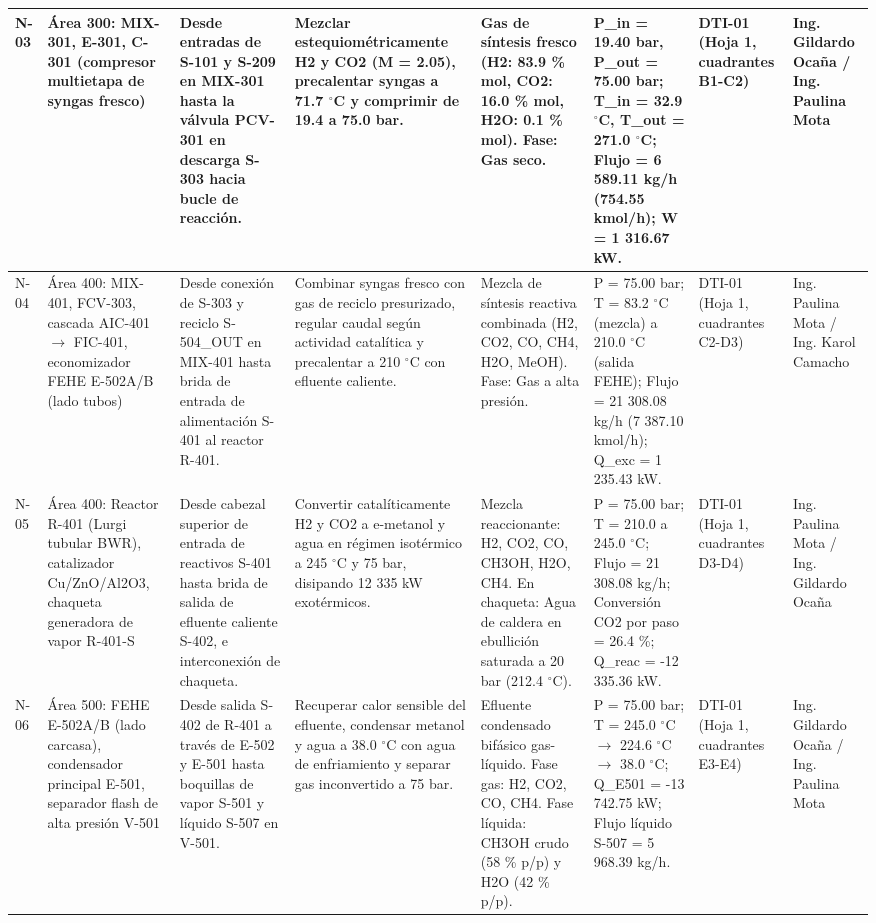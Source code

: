 \documentclass[10pt,letterpaper]{article}
\begin{document}
\begin{landscape}
\begin{table}[H]
\begin{tabularx}{\linewidth}{|l|p{2.8cm}|p{3.2cm}|X|p{2.6cm}|p{2.8cm}|p{1.8cm}|p{2.4cm}|}
N-03 & Área 300: MIX-301, E-301, C-301 (compresor multietapa de syngas fresco) & Desde entradas de S-101 y S-209 en MIX-301 hasta la válvula PCV-301 en descarga S-303 hacia bucle de reacción. & Mezclar estequiométricamente H2 y CO2 (M = 2.05), precalentar syngas a 71.7 $^\circ$C y comprimir de 19.4 a 75.0 bar. & Gas de síntesis fresco (H2: 83.9 \% mol, CO2: 16.0 \% mol, H2O: 0.1 \% mol). Fase: Gas seco. & P\_in = 19.40 bar, P\_out = 75.00 bar; T\_in = 32.9 $^\circ$C, T\_out = 271.0 $^\circ$C; Flujo = 6 589.11 kg/h (754.55 kmol/h); W = 1 316.67 kW. & DTI-01 (Hoja 1, cuadrantes B1-C2) & Ing. Gildardo Ocaña / Ing. Paulina Mota \\ \hline
N-04 & Área 400: MIX-401, FCV-303, cascada AIC-401 $\to$ FIC-401, economizador FEHE E-502A/B (lado tubos) & Desde conexión de S-303 y reciclo S-504\_OUT en MIX-401 hasta brida de entrada de alimentación S-401 al reactor R-401. & Combinar syngas fresco con gas de reciclo presurizado, regular caudal según actividad catalítica y precalentar a 210 $^\circ$C con efluente caliente. & Mezcla de síntesis reactiva combinada (H2, CO2, CO, CH4, H2O, MeOH). Fase: Gas a alta presión. & P = 75.00 bar; T = 83.2 $^\circ$C (mezcla) a 210.0 $^\circ$C (salida FEHE); Flujo = 21 308.08 kg/h (7 387.10 kmol/h); Q\_exc = 1 235.43 kW. & DTI-01 (Hoja 1, cuadrantes C2-D3) & Ing. Paulina Mota / Ing. Karol Camacho \\ \hline
N-05 & Área 400: Reactor R-401 (Lurgi tubular BWR), catalizador Cu/ZnO/Al2O3, chaqueta generadora de vapor R-401-S & Desde cabezal superior de entrada de reactivos S-401 hasta brida de salida de efluente caliente S-402, e interconexión de chaqueta. & Convertir catalíticamente H2 y CO2 a e-metanol y agua en régimen isotérmico a 245 $^\circ$C y 75 bar, disipando 12 335 kW exotérmicos. & Mezcla reaccionante: H2, CO2, CO, CH3OH, H2O, CH4. En chaqueta: Agua de caldera en ebullición saturada a 20 bar (212.4 $^\circ$C). & P = 75.00 bar; T = 210.0 a 245.0 $^\circ$C; Flujo = 21 308.08 kg/h; Conversión CO2 por paso = 26.4 \%; Q\_reac = -12 335.36 kW. & DTI-01 (Hoja 1, cuadrantes D3-D4) & Ing. Paulina Mota / Ing. Gildardo Ocaña \\ \hline
N-06 & Área 500: FEHE E-502A/B (lado carcasa), condensador principal E-501, separador flash de alta presión V-501 & Desde salida S-402 de R-401 a través de E-502 y E-501 hasta boquillas de vapor S-501 y líquido S-507 en V-501. & Recuperar calor sensible del efluente, condensar metanol y agua a 38.0 $^\circ$C con agua de enfriamiento y separar gas inconvertido a 75 bar. & Efluente condensado bifásico gas-líquido. Fase gas: H2, CO2, CO, CH4. Fase líquida: CH3OH crudo (58 \% p/p) y H2O (42 \% p/p). & P = 75.00 bar; T = 245.0 $^\circ$C $\to$ 224.6 $^\circ$C $\to$ 38.0 $^\circ$C; Q\_E501 = -13 742.75 kW; Flujo líquido S-507 = 5 968.39 kg/h. & DTI-01 (Hoja 1, cuadrantes E3-E4) & Ing. Gildardo Ocaña / Ing. Paulina Mota \\ \hline

\end{tabularx}
\end{table}
\end{landscape}
\end{document}
